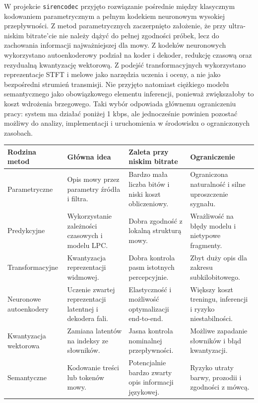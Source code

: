 W projekcie \texttt{sirencodec} przyjęto rozwiązanie pośrednie między klasycznym kodowaniem parametrycznym a pełnym kodekiem neuronowym wysokiej przepływności. Z metod parametrycznych zaczerpnięto założenie, że przy ultra-niskim bitrate'cie nie należy dążyć do pełnej zgodności próbek, lecz do zachowania informacji najważniejszej dla mowy. Z kodeków neuronowych wykorzystano autoenkoderowy podział na koder i dekoder, redukcję czasową oraz rezydualną kwantyzację wektorową. Z podejść transformacyjnych wykorzystano reprezentacje STFT i melowe jako narzędzia uczenia i oceny, a nie jako bezpośredni strumień transmisji. Nie przyjęto natomiast ciężkiego modelu semantycznego jako obowiązkowego elementu inferencji, ponieważ zwiększałoby to koszt wdrożenia brzegowego. Taki wybór odpowiada głównemu ograniczeniu pracy: system ma działać poniżej 1 kbps, ale jednocześnie powinien pozostać możliwy do analizy, implementacji i uruchomienia w środowisku o ograniczonych zasobach.

\begin{center}
\footnotesize
\setlength{\tabcolsep}{4pt}
\begin{tabularx}{0.96\textwidth}{>{\raggedright\arraybackslash}p{} >{\raggedright\arraybackslash}X >{\raggedright\arraybackslash}X >{\raggedright\arraybackslash}X}
\toprule
\textbf{Rodzina metod} & \textbf{Główna idea} & \textbf{Zaleta przy niskim bitrate} & \textbf{Ograniczenie} \\
\midrule
Parametryczne & Opis mowy przez parametry źródła i filtra. & Bardzo mała liczba bitów i niski koszt obliczeniowy. & Ograniczona naturalność i silne uproszczenie sygnału. \\
Predykcyjne & Wykorzystanie zależności czasowych i modelu LPC. & Dobra zgodność z lokalną strukturą mowy. & Wrażliwość na błędy modelu i nietypowe fragmenty. \\
Transformacyjne & Kwantyzacja reprezentacji widmowej. & Dobra kontrola pasm istotnych percepcyjnie. & Zbyt duży opis dla zakresu subkilobitowego. \\
Neuronowe autoenkodery & Uczenie zwartej reprezentacji latentnej i dekodera fali. & Elastyczność i możliwość optymalizacji end-to-end. & Większy koszt treningu, inferencji i ryzyko niestabilności. \\
Kwantyzacja wektorowa & Zamiana latentów na indeksy ze słowników. & Jasna kontrola nominalnej przepływności. & Możliwe zapadanie słowników i błąd kwantyzacji. \\
Semantyczne & Kodowanie treści lub tokenów mowy. & Potencjalnie bardzo zwarty opis informacji językowej. & Ryzyko utraty barwy, prozodii i zgodności z mówcą. \\
\bottomrule
\end{tabularx}
\label{tab:metody-ultra-low-bitrate}
\end{center}

